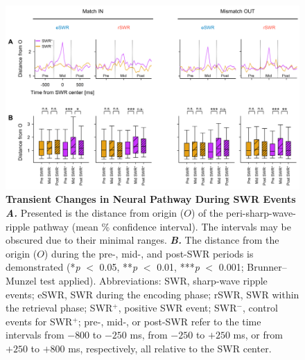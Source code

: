 \documentclass[final,3p,times,twocolumn]{elsarticle}
\begin{document}
        \clearpage
        \begin{figure}[ht]
        	\centering
            \includegraphics[width=1\textwidth]{./src/figures/.png/Figure_ID_05.png}
        	\caption{\textbf{Transient Changes in Neural Pathway During SWR Events}
\smallskip
\\
\textbf{\textit{A.}} Presented is the distance from origin ($O$) of the peri-sharp-wave-ripple pathway (mean \% confidence interval). The intervals may be obscured due to their minimal ranges. \textbf{\textit{B.}} The distance from the origin ($O$) during the pre-, mid-, and post-SWR periods is demonstrated (*\textit{p} $<$ 0.05, **\textit{p} $<$ 0.01, ***\textit{p} $<$ 0.001; Brunner--Munzel test applied). Abbreviations: SWR, sharp-wave ripple events; eSWR, SWR during the encoding phase; rSWR, SWR within the retrieval phase; SWR$^+$, positive SWR event; SWR$^-$, control events for SWR$^+$; pre-, mid-, or post-SWR refer to the time intervals from $-800$ to $-250$ ms, from $-250$ to $+250$ ms, or from $+250$ to $+800$ ms, respectively, all relative to the SWR center.}
        	\label{fig:05}
        \end{figure}
        \clearpage
\end{document}
